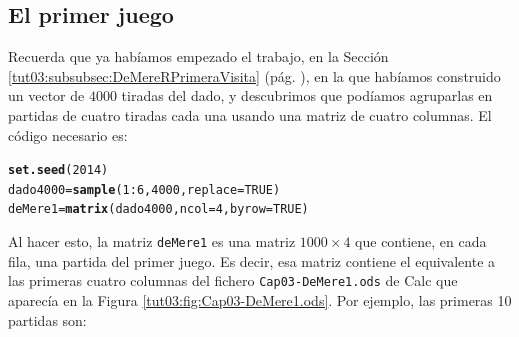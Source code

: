 \documentclass[10pt,a4paper]{article}\usepackage[]{graphicx}\usepackage[]{color}
\makeatletter
\newcommand{\hlnum}[1]{\textcolor[rgb]{0.686,0.059,0.569}{#1}}%
\newcommand{\hlopt}[1]{\textcolor[rgb]{0,0,0}{#1}}%
\newcommand{\hlstd}[1]{\textcolor[rgb]{0.345,0.345,0.345}{#1}}%
\newcommand{\hlkwb}[1]{\textcolor[rgb]{0.69,0.353,0.396}{#1}}%
\newcommand{\hlkwc}[1]{\textcolor[rgb]{0.333,0.667,0.333}{#1}}%
\newcommand{\hlkwd}[1]{\textcolor[rgb]{0.737,0.353,0.396}{\textbf{#1}}}%
\newenvironment{kframe}{%
 \def\at@end@of@kframe{}%
 \ifinner\ifhmode%
  \def\at@end@of@kframe{\end{minipage}}%
  \begin{minipage}{\columnwidth}%
 \fi\fi%
 \def\FrameCommand##1{\hskip\@totalleftmargin \hskip-\fboxsep
 \colorbox{shadecolor}{##1}\hskip-\fboxsep
     \hskip-\linewidth \hskip-\@totalleftmargin \hskip\columnwidth}%
 \MakeFramed {\advance\hsize-\width
   \@totalleftmargin\z@ \linewidth\hsize
   \@setminipage}}%
 {\par\unskip\endMakeFramed%
 \at@end@of@kframe}
\newenvironment{knitrout}{}{} %
\newcounter {cont01}
\makeatother
\begin{document}
                                                                                                                                                            \subsection{El primer juego}
                                                                                                                                                            \label{tut03:subsec:PrimerJuego}
                                                                                                                                                            
                                                                                                                                                            
                                                                                                                                                            Recuerda que ya habíamos empezado el trabajo, en la Sección \ref{tut03:subsubsec:DeMereRPrimeraVisita} (pág. \pageref{tut03:subsubsec:DeMereRPrimeraVisita}), en la que habíamos construido un vector de $4000$ tiradas del dado, y descubrimos que podíamos agruparlas en partidas de cuatro tiradas cada una usando una matriz de cuatro columnas. El código necesario es:
                                                                                                                                                                 
\begin{knitrout}
\color{fgcolor}\begin{kframe}
\begin{alltt}
\hlkwd{set.seed}\hlstd{(}\hlnum{2014}\hlstd{)}
                                                                                                                                                            \hlstd{dado4000} \hlkwb{=} \hlkwd{sample}\hlstd{(}\hlnum{1}\hlopt{:}\hlnum{6}\hlstd{,} \hlnum{4000}\hlstd{,} \hlkwc{replace}\hlstd{=}\hlnum{TRUE}\hlstd{)}
                                                                                                                                                            \hlstd{deMere1} \hlkwb{=} \hlkwd{matrix}\hlstd{(dado4000,} \hlkwc{ncol}\hlstd{=}\hlnum{4}\hlstd{,} \hlkwc{byrow}\hlstd{=}\hlnum{TRUE}\hlstd{)}
\end{alltt}
\end{kframe}
\end{knitrout}
                                                                                                                                                                 Al hacer esto, la matriz {\tt deMere1} es una matriz $1000\times 4$ que contiene, en cada fila, una partida del primer juego. Es decir, esa matriz contiene el equivalente a las primeras cuatro columnas del fichero {\tt Cap03-DeMere1.ods} de Calc que aparecía en la Figura \ref{tut03:fig:Cap03-DeMere1.ods}. Por ejemplo,  las primeras 10 partidas son:
                                                                                                                                                                 
\end{document}
